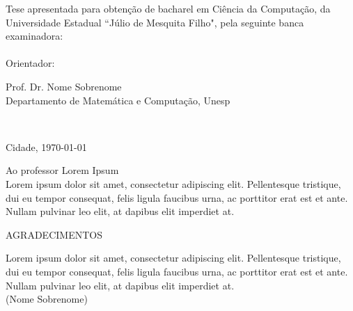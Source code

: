 \documentclass[12pt,nodisplayskipstretch]{article}
\begin{document}
\vspace{2cm}
Tese apresentada para obtenção de bacharel em Ciência da Computação, da Universidade Estadual ``Júlio de Mesquita Filho", pela seguinte banca examinadora:
\\
\vspace{3cm}
\\
Orientador:
\hspace{5mm}
\begin{minipage}[t]{11cm}
Prof. Dr. Nome Sobrenome\\
Departamento de Matemática e Computação, Unesp\\
\end{minipage}\\

\vspace*{\fill}

\begin{center}
    Cidade, \today
\end{center}

\newpage
\thispagestyle{empty}
\vspace*{\fill}
\hspace{34mm}
\begin{minipage}{11cm}
Ao professor Lorem Ipsum\\
Lorem ipsum dolor sit amet, consectetur adipiscing elit. Pellentesque tristique, dui eu tempor consequat, felis ligula faucibus urna, ac porttitor erat est et ante. Nullam pulvinar leo elit, at dapibus elit imperdiet at.
\end{minipage}

\newpage
\thispagestyle{empty}
\begin{center}
    \uppercase{Agradecimentos}
\end{center}
\lipsum[1]

\newpage
\thispagestyle{empty}
\vspace*{\fill}
\hspace{44mm}
\begin{minipage}{10cm}
\begin{flushright}
Lorem ipsum dolor sit amet, consectetur adipiscing elit. Pellentesque tristique, dui eu tempor consequat, felis ligula faucibus urna, ac porttitor erat est et ante. Nullam pulvinar leo elit, at dapibus elit imperdiet at.\\(Nome Sobrenome)
\end{flushright}
\end{minipage}
\end{document}
